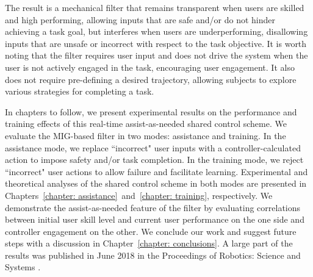 The result is a mechanical filter that remains transparent when users are skilled and high performing, allowing inputs that are safe and/or do not hinder achieving a task goal, but interferes when users are underperforming, disallowing inputs that are unsafe or incorrect with respect to the task objective. It is worth noting that the filter requires user input and does not drive the system when the user is not actively engaged in the task, encouraging user engagement. It also does not require pre-defining a desired trajectory, allowing subjects to explore various strategies for completing a task. 

In chapters to follow, we present experimental results on the performance and training effects of this real-time assist-as-needed shared control scheme. We evaluate the MIG-based filter in two modes: assistance and training. In the assistance mode, we replace ``incorrect" user inputs with a controller-calculated action to impose safety and/or task completion. In the training mode, we reject ``incorrect" user actions to allow failure and facilitate learning. Experimental and theoretical analyses of the shared control scheme in both modes are presented in Chapters~\ref{chapter: assistance}~and~\ref{chapter: training}, respectively. We demonstrate the assist-as-needed feature of the filter by evaluating correlations between initial user skill level and current user performance on the one side and controller engagement on the other. We conclude our work and suggest future steps with a discussion in Chapter~\ref{chapter: conclusions}. A large part of the results was published in June 2018 in the Proceedings of Robotics: Science and Systems \cite{myRSS_MIGMDA}. 

